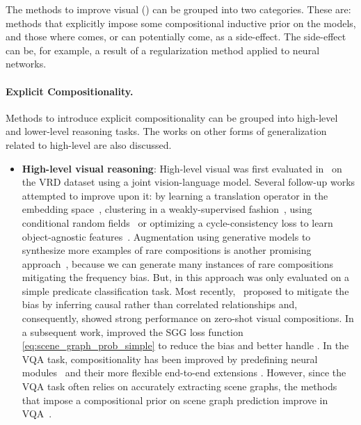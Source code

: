 The methods to improve visual \cg (\cgshort) can be grouped into two categories. These are: methods that explicitly impose some compositional inductive prior on the models, and those where \cgshort comes, or can potentially come, as a side-effect. The side-effect can be, for example, a result of a regularization method applied to neural networks.

\paragraph{Explicit Compositionality.}
Methods to introduce explicit compositionality can be grouped into high-level and lower-level reasoning tasks. The works on other forms of generalization related to high-level \cg are also discussed.

\begin{itemize}[leftmargin=5mm]
    \item \textbf{High-level visual reasoning}: High-level visual \cgshort was first evaluated in~\citep{lu2016visual} on the VRD dataset using a joint vision-language model.
    Several follow-up works attempted to improve upon it: by learning a translation operator in the embedding space~\citep{zhang2017visual}, clustering in a weakly-supervised fashion~\citep{peyre2017weakly}, using conditional random fields~\citep{cong2018scene} or optimizing a cycle-consistency loss to learn object-agnostic features~\citep{yang2018shuffle}. Augmentation using generative models to synthesize more examples of rare compositions is another promising approach~\citep{wang2019generating}, because we can generate many instances of rare compositions mitigating the frequency bias. 
    But, in \citep{wang2019generating} this approach was only evaluated on a simple predicate classification task.
    Most recently,~\citet{tang2020unbiased} proposed to mitigate the bias by inferring causal rather than correlated relationships and, consequently, showed strong performance on zero-shot visual compositions. In a subsequent work, \citet{suhail2021energy} improved the SGG loss function \eqref{eq:scene_graph_prob_simple} to reduce the bias and better handle \cgshort.
    In the VQA task, compositionality has been improved by predefining neural modules~\citep{andreas2016neural} and their more flexible end-to-end extensions \citep{hu2017learning,johnson2017inferring}.
    However, since the VQA task often relies on accurately extracting scene graphs, the methods that impose a compositional prior on scene graph prediction improve \cgshort in VQA~\citep{yi2018neural,mascharka2018transparency,shi2019explainable}.
    

\end{itemize}
